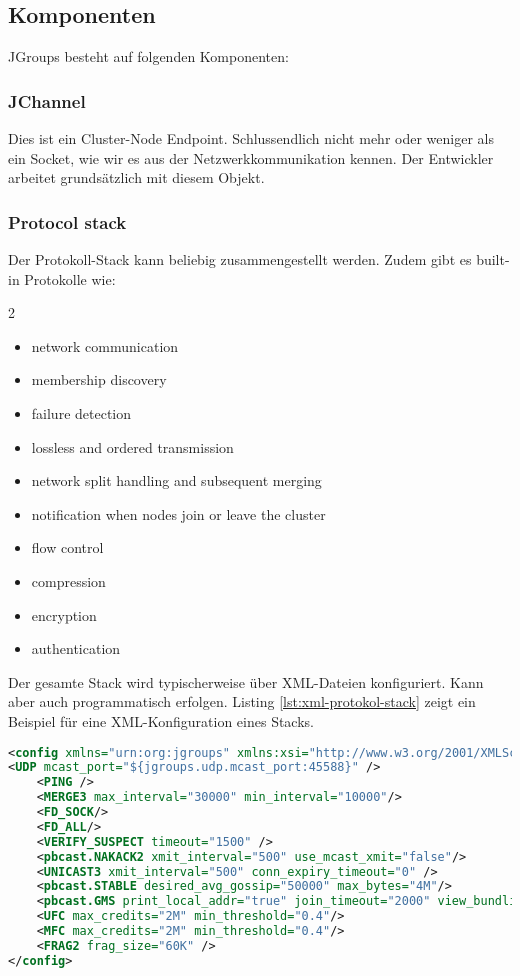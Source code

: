 \subsection{Komponenten}

JGroups besteht auf folgenden Komponenten:

\subsubsection{JChannel}

Dies ist ein Cluster-Node Endpoint. Schlussendlich nicht mehr oder weniger als ein Socket, wie wir es aus der Netzwerkkommunikation kennen. Der Entwickler arbeitet grundsätzlich mit diesem Objekt.

\newpage

\subsubsection{Protocol stack} 

Der Protokoll-Stack kann beliebig zusammengestellt werden. Zudem gibt es built-in Protokolle wie: 
\begin{multicols}{2}
	\begin{itemize}
		\item network communication
		\item membership discovery
		\item failure detection
		\item lossless and ordered transmission
		\item network split handling and subsequent merging
		\item notification when nodes join or leave the cluster
		\item flow control
		\item compression
		\item encryption
		\item authentication
	\end{itemize}
\end{multicols}
Der gesamte Stack wird typischerweise über XML-Dateien konfiguriert. Kann aber auch programmatisch erfolgen. Listing \ref{lst:xml-protokol-stack} zeigt ein Beispiel für eine XML-Konfiguration eines Stacks.
	
\begin{lstlisting}[language=XML, caption=XML für Protokoll Stack, label=lst:xml-protokol-stack]
<config xmlns="urn:org:jgroups" xmlns:xsi="http://www.w3.org/2001/XMLSchema-instance" xsi:schemaLocation="urn:org:jgroups	http://www.jgroups.org/schema/jgroups.xsd">
<UDP mcast_port="${jgroups.udp.mcast_port:45588}" />
	<PING />
	<MERGE3 max_interval="30000" min_interval="10000"/>
	<FD_SOCK/>
	<FD_ALL/>
	<VERIFY_SUSPECT timeout="1500" />
	<pbcast.NAKACK2 xmit_interval="500" use_mcast_xmit="false"/>
	<UNICAST3 xmit_interval="500" conn_expiry_timeout="0" />
	<pbcast.STABLE desired_avg_gossip="50000" max_bytes="4M"/>
	<pbcast.GMS print_local_addr="true" join_timeout="2000" view_bundling="true"/>
	<UFC max_credits="2M" min_threshold="0.4"/>
	<MFC max_credits="2M" min_threshold="0.4"/>
	<FRAG2 frag_size="60K" />
</config>
\end{lstlisting}

